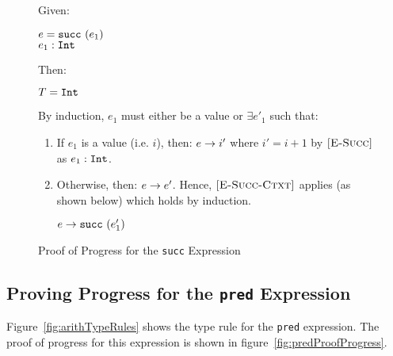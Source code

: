 \documentclass{report}
\newcommand{\rel}[1]{\mbox{\sc [#1]}}
\begin{document}
\begin{figure}[ht!]
Given:
\begin{center}
  $e = \mbox{\tt succ}~(e_1)$ \\
   ${e_1} : {\mbox{\tt Int}}$
\end{center}
Then:~\\
\begin{center}
   $T = \mbox{\tt Int}$
\end{center}

By induction, $e_1$ must either be a value or $\exists e'_1$ such that:~\\

	\begin{enumerate}
    \item If $e_1$ is a value (i.e. $i$), then: ${e} \rightarrow {i'}$ where $i' = i + 1$ by $\rel{E-Succ}$ as ${e_1} : {\mbox{\tt Int}}$.
      
    \item Otherwise, then: ${e} \rightarrow {e'}$.  Hence, $\rel{E-Succ-Ctxt}$ applies (as shown below) which holds by induction.
    
    \begin{center}
      ${e} \rightarrow {\mbox{\tt succ}~(e'_1)}$
    \end{center}
	
	\end{enumerate}
	
  \caption{Proof of Progress for the \texttt{succ} Expression}\label{fig:succProofProgress}
\end{figure}


\subsection{Proving Progress for the \texttt{pred} Expression}

Figure~\ref{fig:arithTypeRules} shows the type rule for the \texttt{pred} expression.  The proof of progress for this expression is shown in figure~\ref{fig:predProofProgress}.
\end{document}
